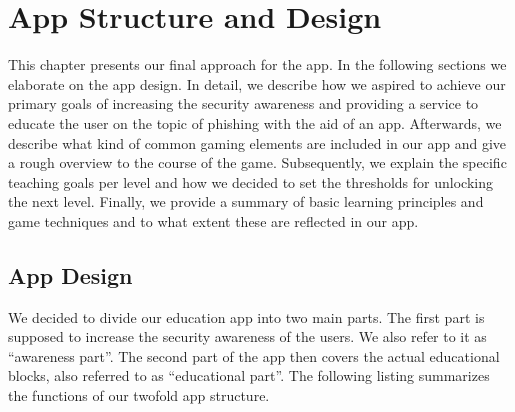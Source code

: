 
\section{App Structure and Design}
\label{s:approach}
This chapter presents our final approach for the app.
 In the following sections we elaborate on the app design.
In detail, we describe how we aspired to achieve our primary goals of increasing the security awareness and providing a service to educate the user on the topic of phishing with the aid of an app.
Afterwards, we describe what kind of common gaming elements are included in our app and give a rough overview to the course of the game.
Subsequently, we explain the specific teaching goals per level and how we decided to set the thresholds for unlocking the next level.
Finally, we provide a summary of basic learning principles and game techniques and to what extent these are reflected in our app.
\subsection{App Design}
\label{s:app_design}
We decided to divide our education app into two main parts.
 The first part is supposed to increase the security awareness of the users.
We also refer to it as ``awareness part''.
 The second part of the app then covers the actual educational blocks, also referred to as ``educational part''.
 The following listing summarizes the functions of our twofold app structure.

